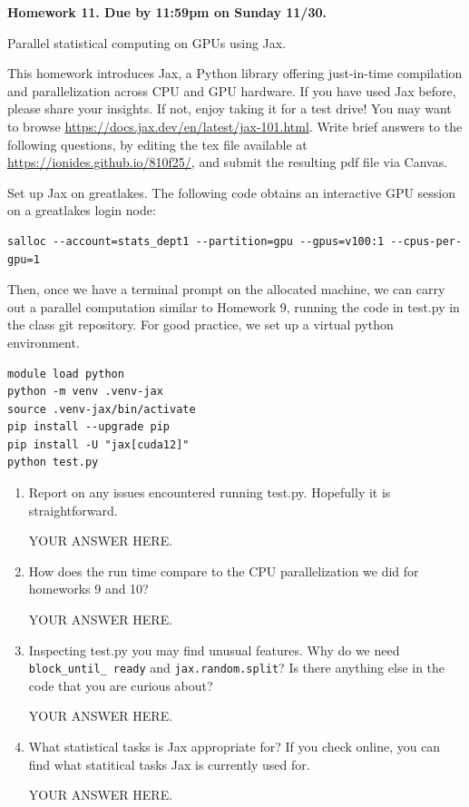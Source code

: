 \documentclass[12pt]{article}
\begin{document}
\begin{center}\bf
Homework 11. Due by 11:59pm on Sunday 11/30.

Parallel statistical computing on GPUs using Jax.

\end{center}

This homework introduces Jax, a Python library offering just-in-time compilation and parallelization across CPU and GPU hardware.
If you have used Jax before, please share your insights. If not, enjoy taking it for a test drive!
You may want to browse \url{https://docs.jax.dev/en/latest/jax-101.html}.
Write brief answers to the following questions, by editing the tex file available at \url{https://ionides.github.io/810f25/}, and submit the resulting pdf file via Canvas. 

Set up Jax on greatlakes. The following code obtains an interactive GPU session on a greatlakes login node:
\begin{verbatim}
salloc --account=stats_dept1 --partition=gpu --gpus=v100:1 --cpus-per-gpu=1
\end{verbatim}
Then, once we have a terminal prompt on the allocated machine, we can carry out a parallel computation similar to Homework 9, running the code in test.py in the class git repository.
For good practice, we set up a virtual python environment.
\begin{verbatim}
module load python
python -m venv .venv-jax
source .venv-jax/bin/activate
pip install --upgrade pip
pip install -U "jax[cuda12]"
python test.py
\end{verbatim}

\begin{enumerate}

\item Report on any issues encountered running test.py. Hopefully it is straightforward. 

YOUR ANSWER HERE.

\item How does the run time compare to the CPU parallelization we did for homeworks 9 and 10?

YOUR ANSWER HERE.

\item Inspecting test.py you may find unusual features. Why do we need \texttt{block\_until\_ ready} and \texttt{jax.random.split}? Is there anything else in the code that you are curious about?

YOUR ANSWER HERE.
  
\item What statistical tasks is Jax appropriate for? If you check online, you can find what statitical tasks Jax is currently used for.

YOUR ANSWER HERE.

\end{enumerate}
\end{document}
